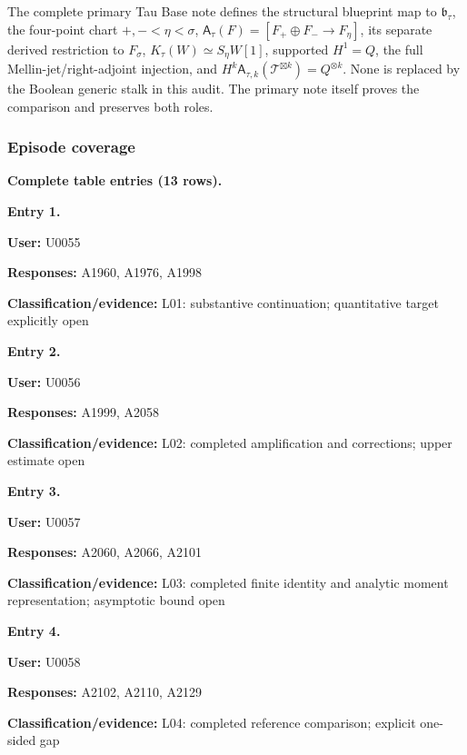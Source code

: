 The complete primary Tau Base note defines the structural blueprint map
to \(\mathfrak b_\tau\), the four-point chart \(+,-<\eta<\sigma\),
\(\mathsf A_\tau(F)=[F_+\oplus F_-\to F_\eta]\), its separate derived
restriction to \(F_\sigma\), \(K_\tau(W)\simeq S_\eta W[1]\), supported
\(H^1=Q\), the full Mellin-jet/right-adjoint injection, and
\(H^k\mathsf A_{\tau,k}(\mathcal T^{\boxtimes k})=Q^{\otimes k}\). None
is replaced by the Boolean generic stalk in this audit. The primary note
itself proves the comparison and preserves both roles.

\subsubsection{Episode coverage}\label{episode-coverage}

\textbf{Complete table entries (13 rows).}


\textbf{Entry 1.}

\textbf{User:} U0055

\textbf{Responses:} A1960, A1976, A1998

\textbf{Classification/evidence:} L01: substantive continuation;
quantitative target explicitly open


\textbf{Entry 2.}

\textbf{User:} U0056

\textbf{Responses:} A1999, A2058

\textbf{Classification/evidence:} L02: completed amplification and
corrections; upper estimate open


\textbf{Entry 3.}

\textbf{User:} U0057

\textbf{Responses:} A2060, A2066, A2101

\textbf{Classification/evidence:} L03: completed finite identity and
analytic moment representation; asymptotic bound open


\textbf{Entry 4.}

\textbf{User:} U0058

\textbf{Responses:} A2102, A2110, A2129

\textbf{Classification/evidence:} L04: completed reference comparison;
explicit one-sided gap


